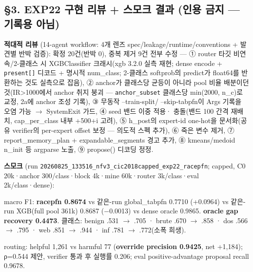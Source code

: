 \subsection{§3. EXP22 구현 리뷰 +\allowbreak{} 스모크 결과 (인용 금지 — 기록용 아님)}
\textbf{적대적 리뷰} (14-agent workflow: 4개 렌즈 spec/\allowbreak{}leakage/\allowbreak{}runtime/\allowbreak{}conventions +\allowbreak{} 발견별 반박 검증): 확정 20건(반박 0), 중복 제거 9건 전부 수정 — ① router 타깃 비연속/\allowbreak{}2-클래스 시 XGBClassifier 크래시(xgb 3.2.0 실측 재현; dense encode +\allowbreak{} \texttt{present[\allowbreak{}]} 디코드 +\allowbreak{} 명시적 num\_\allowbreak{}class; 2-클래스 softprob의 predict가 float64를 반환하는 것도 실측으로 잡음), ② anchor가 클래스당 균등이 아니라 pool 비율 배분이던 것(IR>1000에서 anchor 취지 붕괴 — \texttt{anchor\_\allowbreak{}\allowbreak{}s\allowbreak{}ubset} 클래스당 min(2000, n\_\allowbreak{}c)로 교정, 2a에 anchor 조성 기록), ③ 무동작 --train-split/\allowbreak{} --skip-tabpfn이 Args 기록을 오염 가능  \ensuremath{\rightarrow}  SystemExit 가드, ④ seed 밴드 이중 적용· 충돌(밴드 100 간격 재배치, cap\_\allowbreak{}per\_\allowbreak{}class 내부 +\allowbreak{}500+\allowbreak{}i 고려), ⑤ h\_\allowbreak{}post의 expert-id one-hot을 문서화(공유 verifier의 per-expert offset 보정 — 의도적 스펙 추가), ⑥ 죽은 변수 제거, ⑦ report\_\allowbreak{}memory\_\allowbreak{}plan +\allowbreak{} expandable\_\allowbreak{}segments 경고 추가, ⑧ kmeans/\allowbreak{}medoid n\_\allowbreak{}init 등 argparse 노출, ⑨ propose() 디코딩 정정.

\textbf{스모크} (run \texttt{20260825\allowbreak{}\_\allowbreak{}\allowbreak{}133516\_\allowbreak{}\allowbreak{}nfv3\_\allowbreak{}\allowbreak{}cic\allowbreak{}2018capp\allowbreak{}ed\_\allowbreak{}\allowbreak{}exp22\allowbreak{}\_\allowbreak{}\allowbreak{}racepfn\allowbreak{}}; capped, C0 20k·anchor 300/\allowbreak{}class·block 4k·mine 60k·router 3k/\allowbreak{}class·eval 2k/\allowbreak{}class·dense):

\par\noindent \textbullet\enspace macro F1: \textbf{racepfn 0.8674} vs 같은-run global\_\allowbreak{}tabpfn 0.7710 (+\allowbreak{}0.0964) vs 같은-run XGB(full pool 361k) 0.8687 (−0.0013) vs dense oracle 0.9865. \textbf{oracle gap recovery 0.4473}. 클래스: benign .531 \ensuremath{\rightarrow} .705 · brute .670 \ensuremath{\rightarrow} .858 · dos .566 \ensuremath{\rightarrow} .795 · web .851 \ensuremath{\rightarrow} .944 · inf .781 \ensuremath{\rightarrow} .772(소폭 희생).


\par\noindent \textbullet\enspace routing: helpful 1,261 vs harmful 77 (\textbf{override precision 0.9425}, net +\allowbreak{}1,184); ρ=\allowbreak{}0.544 제안, verifier 통과 후 실행률 0.206; eval positive-advantage proposal recall 0.9678.


